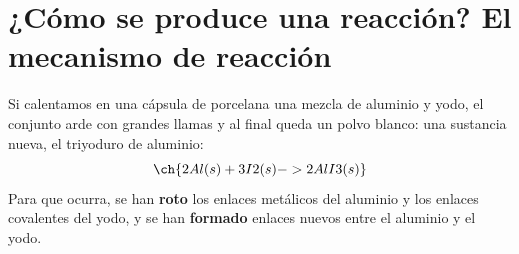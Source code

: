 %
%

\section{¿Cómo se produce una reacción? El mecanismo de reacción}

Si calentamos en una cápsula de porcelana una mezcla de aluminio y yodo, el conjunto arde con grandes llamas y al final queda un polvo blanco: una sustancia nueva, el triyoduro de aluminio:
\[ \ch{2 Al (s) + 3 I2 (s) -> 2 AlI3 (s)} \]
Para que ocurra, se han \textbf{roto} los enlaces metálicos del aluminio y los enlaces covalentes del yodo, y se han \textbf{formado} enlaces nuevos entre el aluminio y el yodo.

